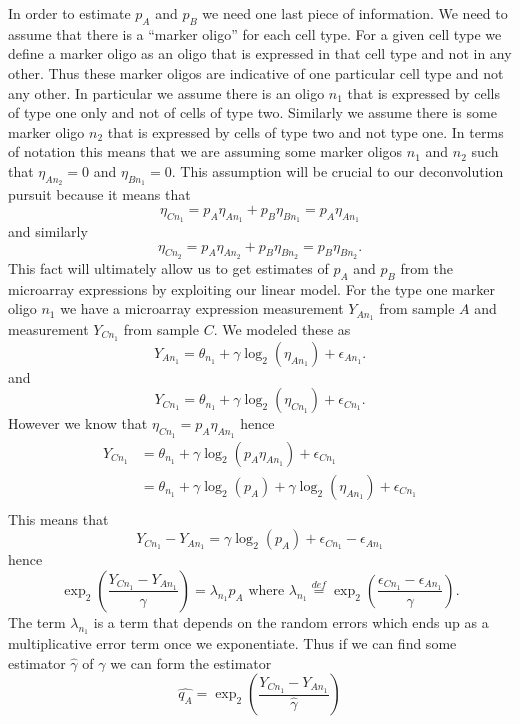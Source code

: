 \documentclass[reqno,12pt,oneside]{report}\usepackage[]{graphicx}\usepackage[]{color}
\theoremstyle{plain}
\theoremstyle{definition}
\theoremstyle{remark}
\numberwithin{theorem}{chapter}     %
\begin{document}
In order to estimate $p_A$ and $p_B$ we need one last piece of information. We need to assume that there is a ``marker oligo'' for each cell type. For a given cell type we define a marker oligo as an oligo that is expressed in that cell type and not in any other. Thus these marker oligos are indicative of one particular cell type and not any other. In particular we assume there is an oligo $n_1$ that is expressed by cells of type one only and not of cells of type two. Similarly we assume there is some marker oligo $n_2$ that is expressed by cells of type two and not type one. In terms of notation this means that we are assuming some marker oligos $n_1$ and $n_2$ such that $\eta_{An_2}=0$ and $\eta_{Bn_1}=0$. This assumption will be crucial to our deconvolution pursuit because it means that 
\[
\eta_{Cn_1} = p_A\eta_{An_1} + p_B\eta_{Bn_1} = p_A\eta_{An_1} 
\]
and similarly 
\[
\eta_{Cn_2} = p_A\eta_{An_2} + p_B\eta_{Bn_2} = p_B\eta_{Bn_2}. 
\]
This fact will ultimately allow us to get estimates of $p_A$ and $p_B$ from the microarray expressions by exploiting our linear model. For the type one marker oligo $n_1$ we have a microarray expression measurement $Y_{An_1}$ from sample $A$ and measurement $Y_{Cn_1}$ from sample $C$. We modeled these as 
\[
Y_{An_1} = \theta_{n_1} + \gamma\log_2\left(\eta_{An_1}\right) + \epsilon_{An_1}.
\]
and
\[
Y_{Cn_1} = \theta_{n_1} + \gamma\log_2\left(\eta_{Cn_1}\right) + \epsilon_{Cn_1}.
\]
However we know that $\eta_{Cn_1} = p_A\eta_{An_1}$ hence 
\[
\begin{aligned}
Y_{Cn_1} &= \theta_{n_1} + \gamma\log_2\left(p_A\eta_{An_1}\right) + \epsilon_{Cn_1}\\
&= \theta_{n_1} + \gamma\log_2\left(p_A\right)+\gamma\log_2\left(\eta_{An_1}\right) + \epsilon_{Cn_1}\\
\end{aligned}
\]
This means that 
\[
Y_{Cn_1}-Y_{An_1} = \gamma\log_2\left(p_A\right) + \epsilon_{Cn_1} - \epsilon_{An_1}
\]
hence
\[
\exp_2\left(\frac{Y_{Cn_1}-Y_{An_1}}{\gamma}\right) = \lambda_{n_1} p_A \text{ where } \lambda_{n_1}\overset{def}{=}\exp_2\left(\frac{\epsilon_{Cn_1} - \epsilon_{An_1}}{\gamma}\right).
\]
The term $\lambda_{n_1}$ is a term that depends on the random errors which ends up as a multiplicative error term once we exponentiate. Thus if we can find some estimator $\widehat{\gamma}$ of $\gamma$ we can form the estimator
\[
\widehat{q_A} = \exp_2\left(\frac{Y_{Cn_1}-Y_{An_1}}{\widehat{\gamma}}\right)
\]
\end{document}

